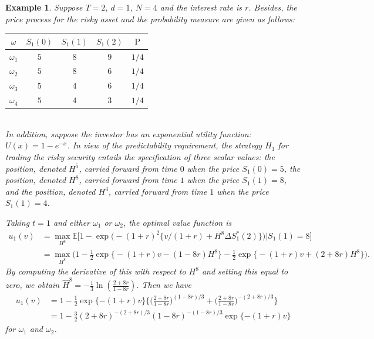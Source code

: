 \documentclass[a4paper]{article}
\newtheorem{exa}{Example}[section]
\theoremstyle{definition}
\numberwithin{equation}{section}
\begin{document}
\begin{exa}
Suppose $T=2$, $d=1$, $N=4$ and the interest rate is $r$. Besides, the price process for the risky asset and the probability measure are given as follows:
\begin{table}[!hbp]
\centering
\begin{tabular}{ccccc}
\hline
$\omega$ & $S_1(0)$ & $S_1(1)$ & $S_1(2)$ & $\mathrm P$\\
\hline
$\omega_1$ & $5$ & $8$ & $9$ & $1/4$\\
$\omega_2$ & $5$ & $8$ & $6$ & $1/4$\\
$\omega_3$ & $5$ & $4$ & $6$ & $1/4$\\
$\omega_4$ & $5$ & $4$ & $3$ & $1/4$\\
\hline
\end{tabular}
\end{table}\\
In addition, suppose the investor has an exponential utility function: $U(x)=1-e^{-x}$. In view of the predictability requirement, the strategy $H_1$ for trading the risky security entails the specification of three scalar values: the position, denoted $H^5$, carried forward from time $0$ when the price $S_1(0)=5$, the position, denoted $H^8$, carried forward from time $1$ when the price $S_1(1)=8$, and the position, denoted $H^4$, carried forward from time $1$ when the price $S_1(1)=4$. 

Taking $t=1$ and either $\omega_1$ or $\omega_2$, the optimal value function is
\begin{equation}\nonumber
\begin{aligned}
u_1(v)&=\max_{H^8}\mathbb E\Big[1-\exp\Big(-(1+r)^2\big\{v/(1+r)+H^8\Delta S^*_1(2)\big\}\Big)\Big\lvert S_1(1)=8\Big]\\
&=\max_{H^8}\Big(1-\frac{1}{2}\exp\big\{-(1+r)v-(1-8r)H^8\big\}-\frac{1}{2}\exp\big\{-(1+r)v+(2+8r)H^8\big\}\Big).
\end{aligned}
\end{equation}
By computing the derivative of this with respect to $H^8$ and setting this equal to zero, we obtain $\hat H^8=-\frac{1}{3}\ln(\frac{2+8r}{1-8r})$.
Then we have
\begin{equation}\nonumber
\begin{aligned}
u_1(v)&=1-\frac{1}{2}\exp\{-(1+r)v\}\Big\{\Big(\frac{2+8r}{1-8r}\Big)^{(1-8r)/3}+\Big(\frac{2+8r}{1-8r}\Big)^{-(2+8r)/3}\Big\}\\
&=1-\frac{3}{2}(2+8r)^{-(2+8r)/3}(1-8r)^{-(1-8r)/3}\exp\{-(1+r)v\}
\end{aligned}
\end{equation}
for $\omega_1$ and $\omega_2$.


\end{exa}
\end{document}
